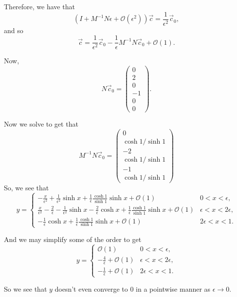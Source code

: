 \begin{example}
Therefore, we have that
\begin{equation}
(I + M^{-1}N \epsilon + \mathcal O(\epsilon^2))\vec c = \frac{1}{\epsilon^2}\vec c_0,
\end{equation}
and so
\begin{equation}
\vec c = \frac{1}{\epsilon^2}\vec c_0 -\frac{1}{\epsilon} M^{-1}N \vec c_0 + \mathcal O(1).
\end{equation}

Now, 
\begin{equation}
N \vec c_0 = \begin{pmatrix}
0\\
2\\
0\\
-1\\
0\\
0
\end{pmatrix}.
\end{equation}

Now we solve to get that
\begin{equation}
M^{-1} N \vec c_0 = 
\begin{pmatrix}
0\\
\cosh 1 /\sinh 1\\
-2\\
\cosh 1 / \sinh 1\\
-1 \\
\cosh 1 / \sinh 1
\end{pmatrix}
\end{equation}
So, we see that
\begin{equation}
y = \begin{cases}
-\frac{x}{\epsilon^2} + \frac{1}{\epsilon^2} \sinh x +\frac{1}{\epsilon}\frac{\cosh 1}{\sinh1} \sinh x + \mathcal O(1)& 0<x<\epsilon,\\
\frac{x}{\epsilon^2} - \frac{2}{\epsilon} - \frac{1}{\epsilon^2}\sinh x - \frac{2}{\epsilon} \cosh x +\frac{1}{\epsilon}\frac{\cosh 1}{\sinh1} \sinh x+ \mathcal O(1) & \epsilon < x < 2\epsilon,\\
-\frac{1}{\epsilon}\cosh x + \frac{1}{\epsilon}\frac{\cosh 1}{\sinh1} \sinh x + \mathcal O(1)& 2\epsilon < x < 1.
\end{cases}
\end{equation}

And we may simplify some of the order to get
\begin{equation}
y = \begin{cases}
\mathcal O(1)& 0<x<\epsilon,\\
- \frac{4}{\epsilon}  +\mathcal O(1) & \epsilon < x < 2\epsilon,\\
-\frac{1}{\epsilon}+ \mathcal O(1)& 2\epsilon < x < 1.
\end{cases}
\end{equation}

So we see that $y$ doesn't even converge to $0$ in a pointwise manner as $\epsilon \to 0$.
\end{example}

